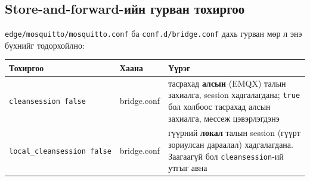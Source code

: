 \hypertarget{store-and-forward-ux438ux439ux43d-ux433ux443ux440ux432ux430ux43d-ux442ux43eux445ux438ux440ux433ux43eux43e}{%
\subsection{Store-and-forward-ийн гурван тохиргоо}\label{store-and-forward-ux438ux439ux43d-ux433ux443ux440ux432ux430ux43d-ux442ux43eux445ux438ux440ux433ux43eux43e}}

\texttt{edge/\allowbreak{}mosquitto/\allowbreak{}mosquitto.\allowbreak{}conf} ба \texttt{conf.\allowbreak{}d/\allowbreak{}bridge.\allowbreak{}conf} дахь гурван мөр л энэ бүхнийг тодорхойлно:

\begingroup\scriptsize\begin{longtable}[]{@{}lll@{}}
\toprule
\begin{minipage}[b]{0.30\columnwidth}\raggedright
Тохиргоо\strut
\end{minipage} & \begin{minipage}[b]{0.30\columnwidth}\raggedright
Хаана\strut
\end{minipage} & \begin{minipage}[b]{0.30\columnwidth}\raggedright
Үүрэг\strut
\end{minipage}\tabularnewline
\midrule
\endhead
\begin{minipage}[t]{0.30\columnwidth}\raggedright
\texttt{cleansession\ false}\strut
\end{minipage} & \begin{minipage}[t]{0.30\columnwidth}\raggedright
bridge.conf\strut
\end{minipage} & \begin{minipage}[t]{0.30\columnwidth}\raggedright
тасрахад \textbf{алсын} (EMQX) талын захиалга, session хадгалагдана; \texttt{true} бол холбоос тасрахад алсын захиалга, мессеж цэвэрлэгдэнэ\strut
\end{minipage}\tabularnewline
\begin{minipage}[t]{0.30\columnwidth}\raggedright
\texttt{local\_\allowbreak{}cleansession\ false}\strut
\end{minipage} & \begin{minipage}[t]{0.30\columnwidth}\raggedright
bridge.conf\strut
\end{minipage} & \begin{minipage}[t]{0.30\columnwidth}\raggedright
гүүрний \textbf{локал} талын session (гүүрт зориулсан дараалал) хадгалагдана. Заагаагүй бол \texttt{cleansession}-ий утгыг авна\strut
\end{minipage}\tabularnewline

\end{longtable}
